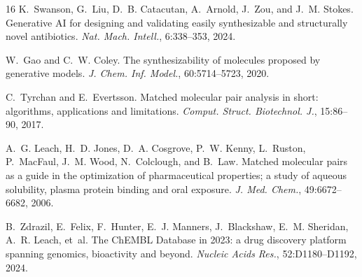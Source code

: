 \documentclass[sigconf, nonacm]{acmart}
\begin{document}
\begin{thebibliography}{16}
K.~Swanson, G.~Liu, D.~B. Catacutan, A.~Arnold, J.~Zou, and J.~M. Stokes.
\newblock Generative AI for designing and validating easily synthesizable and structurally novel antibiotics.
\newblock \textit{Nat. Mach. Intell.}, 6:338--353, 2024.

W.~Gao and C.~W. Coley.
\newblock The synthesizability of molecules proposed by generative models.
\newblock \textit{J. Chem. Inf. Model.}, 60:5714--5723, 2020.

C.~Tyrchan and E.~Evertsson.
\newblock Matched molecular pair analysis in short: algorithms, applications and limitations.
\newblock \textit{Comput. Struct. Biotechnol. J.}, 15:86--90, 2017.

A.~G. Leach, H.~D. Jones, D.~A. Cosgrove, P.~W. Kenny, L.~Ruston, P.~MacFaul, J.~M. Wood, N.~Colclough, and B.~Law.
\newblock Matched molecular pairs as a guide in the optimization of pharmaceutical properties; a study of aqueous solubility, plasma protein binding and oral exposure.
\newblock \textit{J. Med. Chem.}, 49:6672--6682, 2006.

B.~Zdrazil, E.~Felix, F.~Hunter, E.~J. Manners, J.~Blackshaw, E.~M. Sheridan, A.~R. Leach, et~al.
\newblock The ChEMBL Database in 2023: a drug discovery platform spanning genomics, bioactivity and beyond.
\newblock \textit{Nucleic Acids Res.}, 52:D1180--D1192, 2024.

\end{thebibliography}
\end{document}
